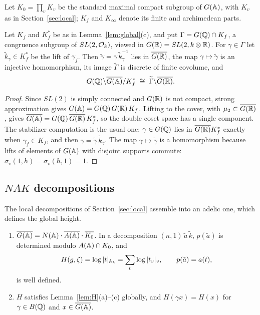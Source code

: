 Let $K_0=\prod_vK_v$ be the standard maximal compact subgroup of
$G(\mathbb{A})$, with $K_v$ as in Section~\ref{sec:local}; $K_f$ and $K_\infty$
denote its finite and archimedean parts.

\begin{lemma}\label{lem:strong}
Let $K_f$ and $K_f^*$ be as in Lemma~\ref{lem:global}(c), and put
$\Gamma=G(\mathbb{Q})\cap K_f$, a congruence subgroup of $SL(2,\mathcal{O}_k)$, viewed in
$G(\mathbb{R})=SL(2,k\otimes\mathbb{R})$. For $\gamma\in\Gamma$ let $\tilde k_\gamma\in K_f^*$ be the lift of
$\gamma_f$. Then $\tilde\gamma=\gamma\,\tilde k_\gamma^{-1}$ lies in
$\overline{G(\mathbb{R})}$, the map $\gamma\mapsto\tilde\gamma$ is an injective
homomorphism, its image $\widetilde\Gamma$ is discrete of finite
covolume, and
\[
G(\mathbb{Q})\backslash\overline{G(\mathbb{A})}/K_f^*\;\cong\;
\widetilde\Gamma\backslash\overline{G(\mathbb{R})}.
\]
\end{lemma}

\begin{proof}
Since $SL(2)$ is simply connected and $G(\mathbb{R})$ is not compact, strong
approximation gives $G(\mathbb{A})=G(\mathbb{Q})\,G(\mathbb{R})\,K_f$. Lifting to the cover,
with $\mu_2\subset\overline{G(\mathbb{R})}$, gives $\overline{G(\mathbb{A})}=
G(\mathbb{Q})\,\overline{G(\mathbb{R})}\,K_f^*$, so the double coset space has a single
component. The stabilizer computation is the usual one: $\gamma\in
G(\mathbb{Q})$ lies in $\overline{G(\mathbb{R})}K_f^*$ exactly when $\gamma_f\in K_f$,
and then $\gamma=\tilde\gamma\,\tilde k_\gamma$. The map
$\gamma\mapsto\tilde\gamma$ is a homomorphism because lifts of elements
of $G(\mathbb{A})$ with disjoint supports commute: $\sigma_v(1,h)=\sigma_v(h,1)=1$.
\end{proof}


\subsection{\texorpdfstring{$NAK$}{NAK} decompositions}

The local decompositions of Section~\ref{sec:local} assemble into an
adelic one, which defines the global height.


\begin{lemma}\label{lem:NAK-global}
\begin{enumerate}[label=(\alph*)]
\item $\overline{G(\mathbb{A})}=N(\mathbb{A})\cdot\overline{A(\mathbb{A})}\cdot\overline{K_0}$. In
  a decomposition $(n,1)\,\tilde a\,\tilde k$, $p(\tilde a)$ is determined
  modulo $A(\mathbb{A})\cap K_0$, and
  \[
  H(g,\zeta)=\log|t|_{\mathbb{A}_k}=\sum_v\log|t_v|_v,\qquad p(\tilde a)=a(t),
  \]
  is well defined.
\item $H$ satisfies Lemma~\ref{lem:H}(a)--(c) globally, and
  $H(\gamma x)=H(x)$ for $\gamma\in B(\mathbb{Q})$ and $x\in\overline{G(\mathbb{A})}$.
\end{enumerate}
\end{lemma}

